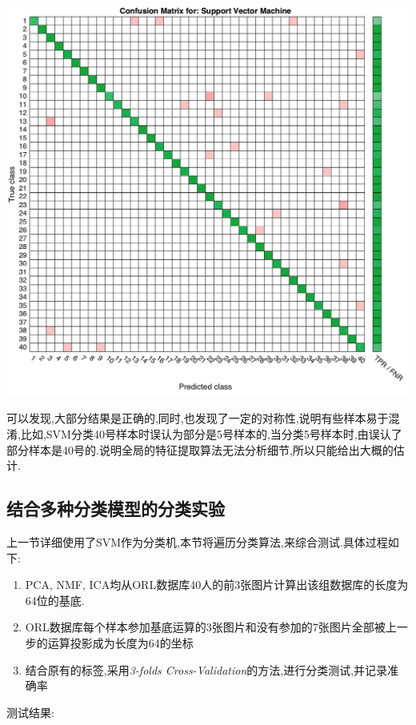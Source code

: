 	\begin{center}
	\begin{minipage}[t]{\linewidth}
	\center
	{
	\includegraphics[width=\textwidth]{Img/svm_confuse} 
	}
	\end{minipage}
	\medskip
	\end{center}
	可以发现,大部分结果是正确的,同时,也发现了一定的对称性,说明有些样本易于混淆,比如,SVM分类40号样本时误认为部分是5号样本的,当分类5号样本时,由误认了部分样本是40号的.说明全局的特征提取算法无法分析细节,所以只能给出大概的估计.

\subsection{结合多种分类模型的分类实验}

上一节详细使用了SVM作为分类机,本节将遍历分类算法,来综合测试.具体过程如下:
	\begin{enumerate}
		\item PCA, NMF, ICA均从ORL数据库40人的前3张图片计算出该组数据库的长度为64位的基底.
		\item ORL数据库每个样本参加基底运算的3张图片和没有参加的7张图片全部被上一步的运算投影成为长度为64的坐标
		\item 结合原有的标签,采用\textit{3-folds Cross-Validation}的方法,进行分类测试,并记录准确率
	\end{enumerate}
	测试结果:

